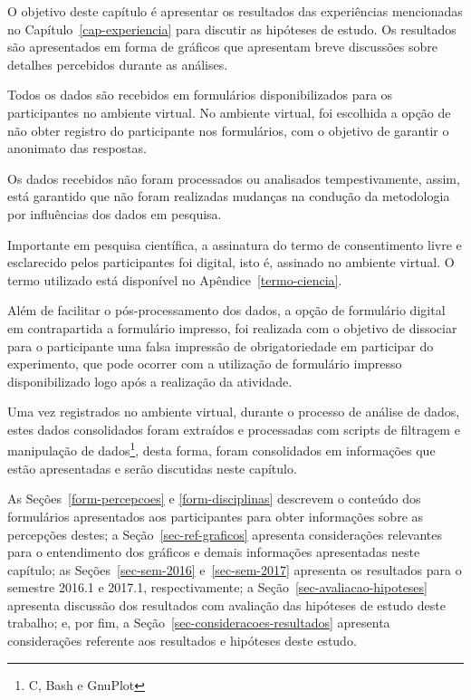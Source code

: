

\label{cap-resultados}
\acresetall

O objetivo deste capítulo é apresentar os resultados das experiências
mencionadas no Capítulo~\ref{cap-experiencia} para discutir as
hipóteses de estudo.
Os resultados são apresentados em forma de gráficos que apresentam
breve discussões sobre detalhes percebidos durante as análises.

Todos os dados são recebidos em formulários
disponibilizados para os participantes no ambiente virtual.
No ambiente virtual, foi escolhida a opção de não
obter registro do participante nos formulários, com o objetivo
de garantir o anonimato das respostas.

Os dados recebidos não foram processados ou analisados
tempestivamente, assim, está garantido que não foram
realizadas mudanças na condução da metodologia
por influências dos dados em pesquisa.

Importante em pesquisa científica, a assinatura do termo
de consentimento livre e esclarecido pelos participantes foi digital,
isto é, assinado no ambiente virtual.
O termo utilizado está disponível no Apêndice~\ref{termo-ciencia}.

Além de facilitar o pós-processamento dos dados, a opção de
formulário digital em contrapartida a formulário impresso, foi
realizada com o objetivo de dissociar para o participante
uma falsa impressão de obrigatoriedade em participar do experimento,
que pode ocorrer com a utilização de formulário impresso disponibilizado
logo após a realização da atividade.


Uma vez registrados no ambiente virtual, durante o processo de análise de dados,
estes dados consolidados foram extraídos e processadas com scripts de filtragem
e manipulação de dados\footnote{C, Bash e GnuPlot}, desta forma, foram consolidados em informações que estão
apresentadas e serão discutidas neste capítulo.

As Seções~\ref{form-percepcoes} e \ref{form-disciplinas} descrevem
o conteúdo dos formulários apresentados aos participantes para obter
informações sobre as percepções destes;
a Seção~\ref{sec-ref-graficos} apresenta considerações relevantes para o
entendimento dos gráficos e demais informações apresentadas neste capítulo;
as Seções~\ref{sec-sem-2016} e~\ref{sec-sem-2017}
apresenta os resultados para o semestre 2016.1 e 2017.1, respectivamente;
a Seção~\ref{sec-avaliacao-hipoteses} apresenta discussão dos resultados
com avaliação das hipóteses de estudo deste trabalho;
e, por fim, a Seção~\ref{sec-consideracoes-resultados} apresenta
considerações referente aos resultados e hipóteses
deste estudo.

